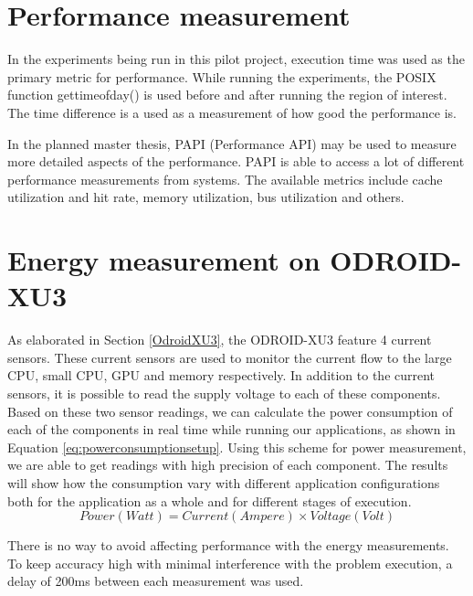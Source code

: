 \section{Performance measurement}
In the experiments being run in this pilot project, execution time was used as the primary metric for performance.
While running the experiments, the POSIX function gettimeofday() is used before and after running the region of interest.
The time difference is a used as a measurement of how good the performance is.

In the planned master thesis, PAPI (Performance API) may be used to measure more detailed aspects of the performance.
PAPI is able to access a lot of different performance measurements from systems.
The available metrics include cache utilization and hit rate, memory utilization, bus utilization and others.

\section{Energy measurement on ODROID-XU3}
As elaborated in Section \ref{OdroidXU3}, the ODROID-XU3 feature 4 current sensors.
These current sensors are used to monitor the current flow to the large CPU, small CPU, GPU and memory respectively.
In addition to the current sensors, it is possible to read the supply voltage to each of these components.
Based on these two sensor readings, we can calculate the power consumption of each of the components in real time while running our applications, as shown in Equation \ref{eq:powerconsumptionsetup}.
Using this scheme for power measurement, we are able to get readings with high precision of each component.
The results will show how the consumption vary with different application configurations both for the application as a whole and for different stages of execution.
\begin{equation} \label{eq:powerconsumptionsetup}
  Power (Watt) = Current (Ampere) \times Voltage (Volt)
\end{equation}

There is no way to avoid affecting performance with the energy measurements.
To keep accuracy high with minimal interference with the problem execution, a delay of 200ms between each measurement was used.
